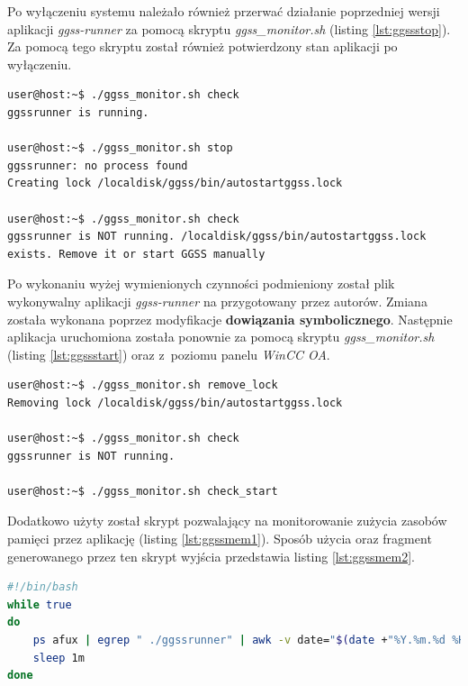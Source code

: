 \newpage
Po wyłączeniu systemu należało również przerwać działanie poprzedniej wersji aplikacji \textit{ggss-runner} za pomocą skryptu \textit{ggss\_monitor.sh} (listing \ref{lst:ggssstop}). Za pomocą tego skryptu został również potwierdzony stan aplikacji po wyłączeniu.


\begin{lstlisting}[language=Cmd, caption={Zatrzymanie działania aplikacji \textit{ggss-runner}}, label={lst:ggssstop}]
user@host:~$ ./ggss_monitor.sh check
ggssrunner is running.

user@host:~$ ./ggss_monitor.sh stop
ggssrunner: no process found
Creating lock /localdisk/ggss/bin/autostartggss.lock

user@host:~$ ./ggss_monitor.sh check
ggssrunner is NOT running. /localdisk/ggss/bin/autostartggss.lock exists. Remove it or start GGSS manually
\end{lstlisting}



Po wykonaniu wyżej wymienionych czynności podmieniony został plik wykonywalny aplikacji \textit{ggss-runner} na przygotowany przez autorów. Zmiana została wykonana poprzez modyfikacje \textbf{dowiązania symbolicznego}. Następnie aplikacja uruchomiona została ponownie za pomocą skryptu \textit{ggss\_monitor.sh} (listing \ref{lst:ggssstart}) oraz z~poziomu panelu \textit{WinCC OA}.

\begin{lstlisting}[language=Cmd, caption={Ponowne uruchomienie aplikacji \textit{ggss-runner}}, label={lst:ggssstart}]
user@host:~$ ./ggss_monitor.sh remove_lock
Removing lock /localdisk/ggss/bin/autostartggss.lock

user@host:~$ ./ggss_monitor.sh check
ggssrunner is NOT running.

user@host:~$ ./ggss_monitor.sh check_start
\end{lstlisting}


Dodatkowo użyty został skrypt pozwalający na monitorowanie zużycia zasobów pamięci przez aplikację (listing \ref{lst:ggssmem1}). Sposób użycia oraz fragment generowanego przez ten skrypt wyjścia przedstawia listing \ref{lst:ggssmem2}. 

\begin{lstlisting}[language=bash, caption={Skrypt \textit{check\_mem\_ggssrunner.sh} służacy do monitorowania pamięci używanej przez aplikację \textit{ggss-runner}}, label={lst:ggssmem1}]
#!/bin/bash
while true
do
    ps afux | egrep " ./ggssrunner" | awk -v date="$(date +"%Y.%m.%d %H:%M:%S")" '{print date, $5}'
    sleep 1m
done
\end{lstlisting}


